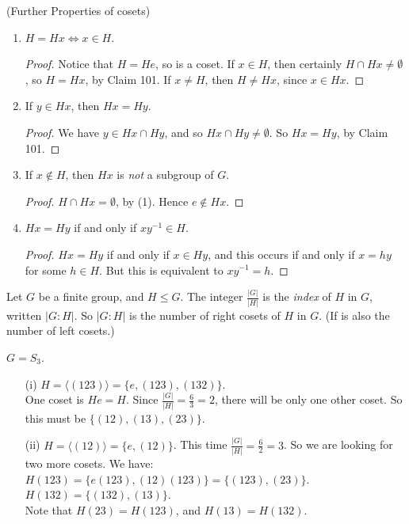 \begin{remarks} (Further Properties of cosets) \begin{enumerate}
 \item  $H = Hx \iff x \in H$.\begin{proof}
Notice that $H = He$, so is a coset. If $x \in H$, then certainly $H \cap Hx \neq \emptyset$, so $H = Hx$, by Claim 101.	If $x \neq H$, then $H \neq Hx$, since $x \in Hx$.
\end{proof}
\item If $y \in Hx$, then $Hx = Hy$. \begin{proof}
 We have $y \in Hx \cap Hy$, and so $Hx \cap Hy \neq \emptyset$. So $Hx = Hy$, by Claim 101.	
 \end{proof}
 
 \item If $x \not\in H$, then $Hx$ is \emph{not} a subgroup of $G$. \begin{proof}
 	$H \cap Hx = \emptyset$, by (1). Hence $e \not\in Hx$. 
 \end{proof}

\item $Hx = Hy$ if and only if $xy^{-1} \in H$.\begin{proof}
$Hx = Hy$ if and only if $x \in Hy$, and this occurs if and only if $x = hy$ for some $h \in H$. But this is equivalent to $xy^{-1} = h$.	
\end{proof}
 \end{enumerate}
 \end{remarks} \vspace*{10pt}

\begin{definition} Let $G$ be a finite group, and $H \leq G$. The integer $\frac{|G|}{|H|}$ is the \emph{index} of $H$ in $G$, written $|G : H|$. So $|G:H|$ is the number of right cosets of $H$ in $G$. (If is also the number of left cosets.)	
\end{definition}\vspace*{10pt}


\begin{examples} $G = S_3$. \begin{enumerate}
 \item[(i)] $H = \langle (123) \rangle = \{e,(123),(132)\}$.\\[-0.3cm]
 
 One coset is $He = H$. Since $\frac{|G|}{|H|} = \frac{6}{3} = 2$, there will be only one other coset. So this must be $\{(12),(13),(23)\}$.
 
 \item[(ii)] $H = \langle (12) \rangle = \{e,(12)\}$. This time $\frac{|G|}{|H|} = \frac{6}{2} = 3$. So we are looking for two more cosets. We have:\\[-0.3cm]
 
  $H(123) = \{e(123),(12)(123)\} = \{(123),(23)\}$.\\
   $H(132) = \{(132),(13)\}$.\\[-0.3cm]
 
 Note that $H(23) = H(123)$, and $H(13) = H(132)$.
 \end{enumerate}
 \end{examples}\vspace*{10pt}
 

